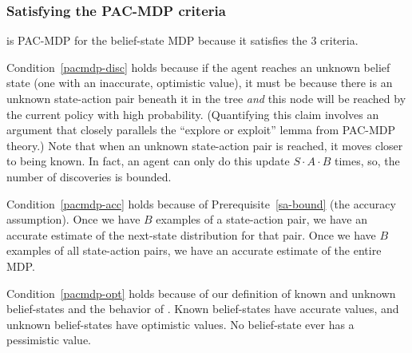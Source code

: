 \subsubsection{Satisfying the PAC-MDP criteria}

 is PAC-MDP for the belief-state MDP because it satisfies the 3 criteria.

Condition~\ref{pacmdp-disc} holds because if the agent reaches an unknown belief state (one with an inaccurate, optimistic value), it must be because there is an unknown state-action pair beneath it in the tree \emph{and} this node will be reached by the current policy with high probability.  (Quantifying this claim  involves an argument that closely parallels the ``explore or exploit'' lemma from PAC-MDP theory.)  Note that when an unknown state-action pair is reached, it moves closer to being known.  In fact, an agent can only do this update $S\cdot A \cdot B$ times, so, the number of discoveries is bounded.


Condition~\ref{pacmdp-acc} holds because of Prerequisite~\ref{sa-bound} (the accuracy assumption). Once we have $B$ examples of a state-action pair, we have an accurate estimate of the next-state distribution for that pair. Once we have $B$ examples of all state-action pairs, we have an accurate estimate of the entire MDP.


Condition~\ref{pacmdp-opt} holds because of our definition of known and unknown belief-states and the behavior of . Known belief-states have accurate values, and unknown belief-states have optimistic values. No belief-state ever has a pessimistic value.

